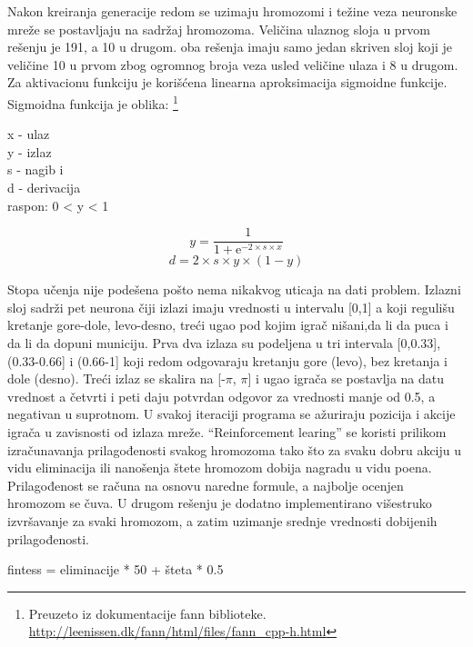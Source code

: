 \documentclass[a4paper]{article}
\begin{document}
\par Nakon kreiranja generacije redom se uzimaju hromozomi i težine veza neuronske mreže se postavljaju na sadržaj hromozoma. Veličina ulaznog sloja u prvom rešenju je 191, a 10 u drugom. oba rešenja imaju samo jedan skriven sloj koji je veličine 10 u prvom zbog ogromnog broja veza usled veličine ulaza i 8 u drugom. Za aktivacionu funkciju je korišćena linearna aproksimacija sigmoidne funkcije. Sigmoidna funkcija je oblika: \footnote{Preuzeto iz dokumentacije fann biblioteke. \url{http://leenissen.dk/fann/html/files/fann_cpp-h.html}}
\begin{tcolorbox}
\begin{center}
x - ulaz \\
y - izlaz \\ 
s - nagib i \\
d - derivacija \\
raspon: 0 < y < 1 \\
\end{center}
\begin{equation}
y = \frac{1}{1 + \mathrm{e}^{-2 \times s \times x}}
\end{equation}
\begin{equation}
d = 2 \times s \times y \times (1 - y)
\end{equation}
\end{tcolorbox}
\noindent  Stopa učenja nije podešena pošto nema nikakvog uticaja na dati problem. Izlazni sloj sadrži pet neurona čiji izlazi imaju vrednosti u intervalu [0,1] a koji regulišu kretanje gore-dole, levo-desno, treći ugao pod kojim igrač nišani,da li da puca i da li da dopuni municiju. Prva dva izlaza su podeljena u tri intervala [0,0.33], (0.33-0.66] i (0.66-1] koji redom odgovaraju kretanju gore (levo), bez kretanja i dole (desno). Treći izlaz se skalira na [-$\pi$, $\pi$] i ugao igrača se postavlja na datu vrednost a četvrti i peti daju potvrdan odgovor za vrednosti manje od 0.5, a negativan u suprotnom. U svakoj iteraciji programa se ažuriraju pozicija i akcije igrača u zavisnosti od izlaza mreže. “Reinforcement learing” se koristi prilikom izračunavanja prilagođenosti svakog hromozoma tako što za svaku dobru akciju u vidu eliminacija ili nanošenja štete hromozom dobija nagradu u vidu poena. Prilagođenost se računa na osnovu naredne formule, a najbolje ocenjen hromozom se čuva. U drugom rešenju je dodatno implementirano višestruko izvršavanje za svaki hromozom, a zatim uzimanje srednje vrednosti dobijenih prilagođenosti.
\begin{tcolorbox}
fintess = eliminacije * 50 + šteta * 0.5
\end{tcolorbox}
\end{document}
